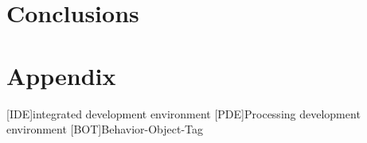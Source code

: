 \documentclass{./llncs2e/llncs}
\begin{document}
\section{Conclusions}

\newpage
\appendix
\section{Appendix}
\label{sec:attachments}

\begin{acronym}
	[IDE]{integrated development environment}
	[PDE]{Processing development environment}
	[BOT]{Behavior-Object-Tag}
\end{acronym}

% 
% 
 

 
\end{document}

